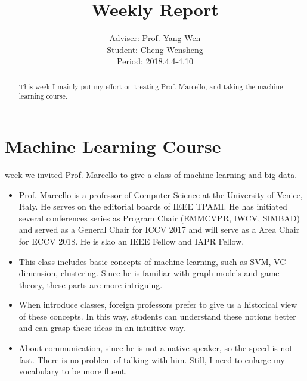 \documentclass[]{IEEEtran}
\begin{document}
	\title{Weekly Report}
	\author{Adviser: Prof. Yang Wen \\Student: Cheng Wensheng\\ Period: 2018.4.4-4.10
	}
	\maketitle

\begin{abstract}
	This week I mainly put my effort on treating Prof. Marcello, and taking the machine learning course.
\end{abstract}

\section{Machine Learning Course}
	 week we invited Prof. Marcello to give a class of machine learning and big data.
	\begin{itemize}
		\item Prof. Marcello is a professor of Computer Science at the University of Venice, Italy. He serves on the editorial boards of IEEE TPAMI. He has initiated several conferences series as Program Chair (EMMCVPR, IWCV, SIMBAD) and served as a General Chair for ICCV 2017 and will serve as a Area Chair for ECCV 2018. He is slao an IEEE Fellow and IAPR Fellow.
		\item This class includes basic concepts of machine learning, such as SVM, VC dimension, clustering. Since he is familiar with graph models and game theory, these parts are more intriguing.
		\item When introduce classes, foreign professors prefer to give us a historical view of these concepts. In this way, students can understand these notions better and can grasp these ideas in an intuitive way.
		\item About communication, since he is not a native speaker, so the speed is not fast. There is no problem of talking with him. Still, I need to enlarge my vocabulary to be more fluent.
	\end{itemize}
\end{document}
